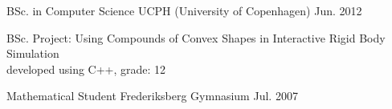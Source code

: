 \begin{cventries}
\cventry
{BSc. in Computer Science} %
{UCPH (University of Copenhagen)} %
{} %
{Jun. 2012} %
{ %
\begin{cvitems}
\item {BSc. Project: Using Compounds of Convex Shapes in Interactive Rigid Body Simulation\\
		\phantom{x}\scriptsize{developed using C++, grade: 12}}
\end{cvitems}
}

\cventry
{Mathematical Student} %
{Frederiksberg Gymnasium} %
{} %
{Jul. 2007} %
{ %
}


\end{cventries}
